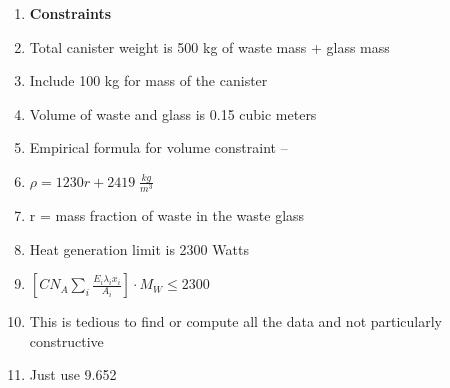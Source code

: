 \documentclass[aspectratio=1610,pdftex,dvipsnames,compress,xcolor={dvipsnames}]{beamer}
\begin{document}
\begin{frame}[t]{}
    \begin{enumerate}[series=outerlist,topsep=0pt,itemsep=5pt,label=(\arabic*)]
        \item[]\textbf{Constraints}
        \item Total canister weight is 500 kg of waste mass + glass mass
        \item[]Include 100 kg for mass of the canister
            \vspace{0.15in}
        \item Volume of waste and glass is 0.15 cubic meters
            \vspace{0.15in}
        \item Empirical formula for volume constraint --
        \item[]$\rho = 1230r + 2419 \; \frac{kg}{m^3}$
        \item[]r = mass fraction of waste in the waste glass
            \vspace{0.15in}
        \item Heat generation limit is 2300 Watts
        \item[]$[C N_A \sum_i \frac{E_i \lambda_i x_i}{A_i}] \cdot M_W \leq 2300$
        \item[]This is tedious to find or compute all the data and not particularly constructive
        \item[]Just use 9.652
    \end{enumerate}
\end{frame}
\end{document}
